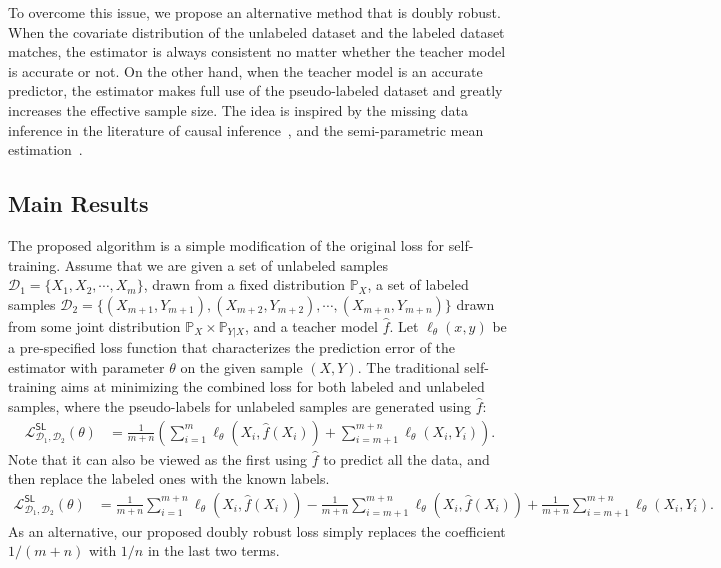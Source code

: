To overcome this issue, we propose an alternative method that is doubly robust. 
 When the covariate distribution of the unlabeled dataset and the labeled dataset matches, the estimator is always  consistent  no matter whether  the  teacher model is accurate or not. On the other hand, when the teacher model is an accurate predictor, the estimator makes full use of the pseudo-labeled dataset and greatly increases the effective sample size. The idea is inspired by the missing data inference in the literature of causal inference~\citep{rubin1976inference, kang2007demystifying, birhanu2011doubly, ding2018causal}, and the semi-parametric mean estimation~\citep{zhang2019semi}.

\subsection{Main Results}
The proposed algorithm is a simple modification of the original loss for self-training.   Assume that we are given a set of unlabeled samples $\mathcal{D}_1 = \{X_1,X_2,\cdots, X_m\}$, drawn from a fixed distribution $\mathbb{P}_X$, a set of labeled samples $\mathcal{D}_2 =\{(X_{m+1}, Y_{m+1}), (X_{m+2}, Y_{m+2}), \cdots, (X_{m+n}, Y_{m+n})\}$ drawn from some joint distribution $\mathbb{P}_X\times \mathbb{P}_{Y|X}$, and a teacher model  $\hat f$. Let $\ell_\theta(x, y)$ be a pre-specified loss function that characterizes the prediction error of the estimator with parameter $\theta$ on the given sample $(X, Y)$. The traditional self-training aims at minimizing the combined loss for both labeled and unlabeled samples, where the pseudo-labels for unlabeled samples are generated using $\hat f$:
\begin{align*}
\mathcal{L}^{\mathsf{SL}}_{\mathcal{D}_1,\mathcal{D}_2}(\theta) 
& = \frac{1}{m+n}  \left(\sum_{i=1}^m \ell_\theta(X_i, \hat f(X_i)) + \sum_{i=m+1}^{m+n} \ell_\theta(X_i, Y_i)\right). %
\end{align*}
Note that it can also be viewed as the first using $\hat f$ to predict all the data, and then replace the labeled ones with the known labels.  
\begin{align*}
\mathcal{L}^{\mathsf{SL}}_{\mathcal{D}_1,\mathcal{D}_2}(\theta) 
 & = \frac{1}{m+n}  \sum_{i=1}^{m+n} \ell_\theta(X_i, \hat f(X_i)) -  \frac{1}{m+n} \sum_{i=m+1}^{m+n} \ell_\theta(X_i, \hat f(X_i))  + \frac{1}{m+n} \sum_{i=m+1}^{m+n} \ell_\theta(X_i, Y_i). 
\end{align*}
As an alternative, our proposed doubly robust loss simply replaces the coefficient $1/(m+n)$ with $1/n$ in the last two terms. 

